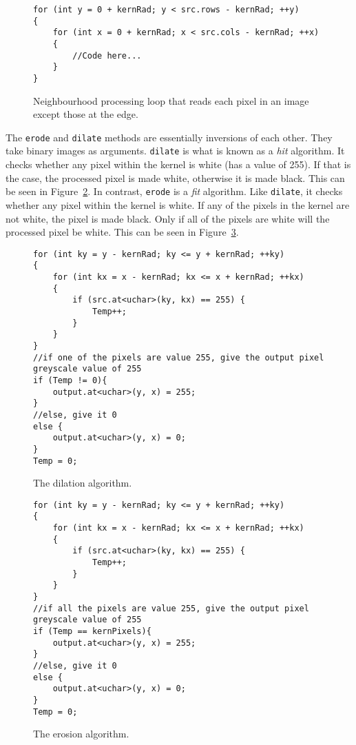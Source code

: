 \begin{figure}[!h]
\begin{lstlisting}
for (int y = 0 + kernRad; y < src.rows - kernRad; ++y)
{
	for (int x = 0 + kernRad; x < src.cols - kernRad; ++x)
	{
		//Code here...
	}
}
\end{lstlisting}
\caption{Neighbourhood processing loop that reads each pixel in an image except those at the edge. \label{fig:neighbourhoodForLoop}}
\end{figure}

The \texttt{erode} and \texttt{dilate} methods are essentially inversions of each other. They take binary images as arguments. \texttt{dilate} is what is known as a \textit{hit} algorithm. It checks whether any pixel within the kernel is white (has a value of 255). If that is the case, the processed pixel is made white, otherwise it is made black. This can be seen in Figure~\ref{fig:dilateAlgorith}. In contrast, \texttt{erode} is a \textit{fit} algorithm. Like \texttt{dilate}, it checks whether any pixel within the kernel is white. If any of the pixels in the kernel are not white, the pixel is made black. Only if all of the pixels are white will the processed pixel be white. This can be seen in Figure~\ref{fig:erodeAlgorithm}.

\begin{figure}[!h]
\begin{lstlisting}
for (int ky = y - kernRad; ky <= y + kernRad; ++ky)
{
	for (int kx = x - kernRad; kx <= x + kernRad; ++kx)
	{
		if (src.at<uchar>(ky, kx) == 255) {
			Temp++;
		}
	}
}
//if one of the pixels are value 255, give the output pixel greyscale value of 255
if (Temp != 0){
	output.at<uchar>(y, x) = 255;
}
//else, give it 0
else {
	output.at<uchar>(y, x) = 0;
}
Temp = 0;
\end{lstlisting}
\caption{The dilation algorithm. \label{fig:dilateAlgorith}}
\end{figure}

\begin{figure}
\begin{lstlisting}
for (int ky = y - kernRad; ky <= y + kernRad; ++ky)
{
	for (int kx = x - kernRad; kx <= x + kernRad; ++kx)
	{
		if (src.at<uchar>(ky, kx) == 255) {
			Temp++;
		}
	}
}
//if all the pixels are value 255, give the output pixel greyscale value of 255
if (Temp == kernPixels){
	output.at<uchar>(y, x) = 255;
}
//else, give it 0
else {
	output.at<uchar>(y, x) = 0;
}
Temp = 0;
\end{lstlisting}
\caption{The erosion algorithm.\label{fig:erodeAlgorithm}}
\end{figure}

